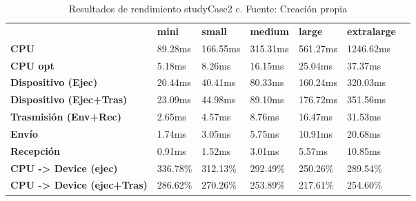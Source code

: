 \begin{table}[H]
    \centering
    \begin{tabular}{lllllll}
    \rowcolor[HTML]{DAE8FC} \ &  \textbf{mini} &  \textbf{small} &  \textbf{medium} &  \textbf{	large} &  \textbf{	extralarge} \\
    \cellcolor[HTML]{DAE8FC} \textbf{CPU} & 89.28ms & 166.55ms & 315.31ms & 	561.27ms & 	1246.62ms \\
    \rowcolor[HTML]{EFEFEF} \cellcolor[HTML]{DAE8FC} \textbf{CPU opt} & 5.18ms & 8.26ms & 16.15ms & 	25.04ms & 	37.37ms \\
    \cellcolor[HTML]{DAE8FC} \textbf{Dispositivo (Ejec)} & 20.44ms & 40.41ms & 80.33ms & 	160.24ms & 	320.03ms \\
    \rowcolor[HTML]{EFEFEF} \cellcolor[HTML]{DAE8FC} \textbf{Dispositivo (Ejec+Tras)} & 23.09ms & 44.98ms & 89.10ms & 	176.72ms & 	351.56ms \\
    \cellcolor[HTML]{DAE8FC} \textbf{Trasmisión (Env+Rec)} & 2.65ms & 4.57ms & 8.76ms & 	16.47ms & 	31.53ms \\
    \rowcolor[HTML]{EFEFEF} \cellcolor[HTML]{DAE8FC} \textbf{Envío} & 1.74ms & 3.05ms & 5.75ms & 	10.91ms & 	20.68ms \\
    \cellcolor[HTML]{DAE8FC} \textbf{Recepción} & 0.91ms & 1.52ms & 3.01ms & 	5.57ms & 	10.85ms \\
    \rowcolor[HTML]{EFEFEF} \cellcolor[HTML]{DAE8FC} \textbf{CPU -> Device (ejec)} & 336.78\% & 312.13\% & 292.49\% & 	250.26\% & 	289.54\% \\
    \cellcolor[HTML]{DAE8FC} \textbf{CPU -> Device (ejec+Tras)} & 286.62\% & 270.26\% & 253.89\% & 	217.61\% & 	254.60\% \\
    \end{tabular}
    \caption[Resultados de rendimiento studyCase2 c]{{Resultados de rendimiento studyCase2 c. Fuente: Creación propia}}
    \label{table_test_studyCase2_c_hw_performanceResults}
\end{table}
